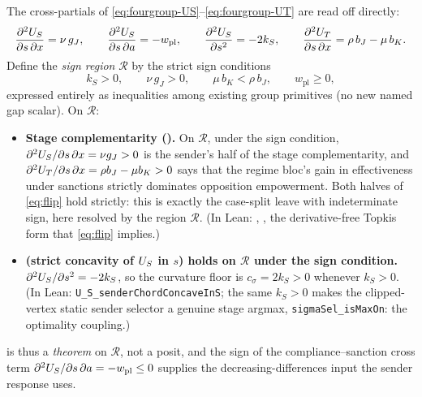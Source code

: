 The cross-partials of \eqref{eq:fourgroup-US}--\eqref{eq:fourgroup-UT}
are read off directly:
\begin{equation}
\frac{\partial^2U_S}{\partial s\,\partial x}=\nu\,g_J,
\qquad
\frac{\partial^2U_S}{\partial s\,\partial a}=-w_{\mathrm{pl}},
\qquad
\frac{\partial^2U_S}{\partial s^2}=-2k_S,
\qquad
\frac{\partial^2U_T}{\partial s\,\partial x}=\rho\,b_J-\mu\,b_K .
\label{eq:fourgroup-crosspartials}
\end{equation}
Define the \emph{sign region} $\mathcal R$ by the strict
sign conditions
\begin{equation}
k_S>0,
\qquad
\nu\,g_J>0,
\qquad
\mu\,b_K<\rho\,b_J,
\qquad
w_{\mathrm{pl}}\ge 0,
\label{eq:fourgroup-region}
\end{equation}
expressed entirely as inequalities among existing group primitives
(no new named gap scalar). On $\mathcal R$:
\begin{itemize}[leftmargin=2em]
\item \textbf{Stage complementarity ().}
On $\mathcal R$, under the sign condition,
$\partial^2U_S/\partial s\,\partial x=\nu g_J>0$ is the sender's half of
the stage complementarity, and
$\partial^2U_T/\partial s\,\partial x=\rho b_J-\mu b_K>0$ says that the
regime bloc's gain in effectiveness under sanctions strictly dominates opposition empowerment.
Both halves of \eqref{eq:flip} hold strictly: this is exactly the
case-split \citeauthor{Kaempfer1988} leave with indeterminate sign,
here resolved by the region $\mathcal R$. (In Lean:
, ,
the derivative-free Topkis form that \eqref{eq:flip} implies.)
\item \textbf{ (strict concavity of $U_S$ in $s$)
holds on $\mathcal R$ under the sign condition.} $\partial^2U_S/\partial s^2=-2k_S$, so the curvature
floor is $c_\sigma=2k_S>0$ whenever $k_S>0$. (In Lean:
\texttt{U\_S\_senderChordConcaveInS}; the same $k_S>0$ makes the
clipped-vertex static sender selector a genuine stage argmax,
\texttt{sigmaSel\_isMaxOn}: the optimality coupling.)
\end{itemize}
 is thus a \emph{theorem} on $\mathcal R$, not a posit,
and the sign of the compliance--sanction cross term
$\partial^2U_S/\partial s\,\partial a=-w_{\mathrm{pl}}\le 0$ supplies
the decreasing-differences input the sender response uses.

